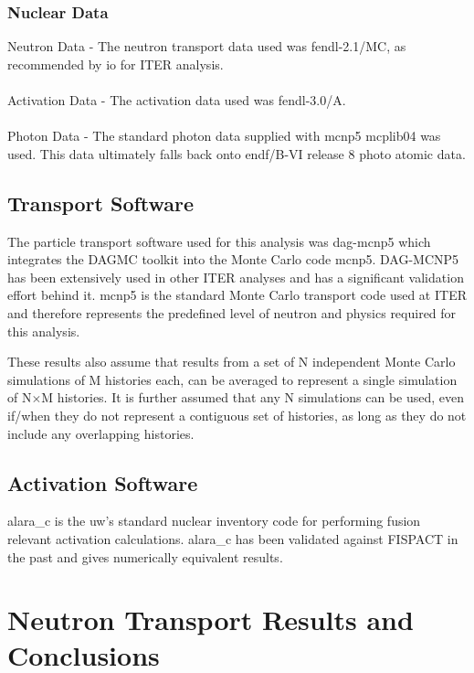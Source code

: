 \documentclass[12pt]{article}
\begin{document}
\subsubsection*{Nuclear Data}
Neutron Data - The neutron transport data used was \gls{fendl}-2.1/MC, as 
recommended by \gls{io} for ITER analysis. 
\\
\\
Activation Data - The activation data used was \gls{fendl}-3.0/A.
\\
\\
Photon Data - The standard photon data supplied with \gls{mcnp5} mcplib04 was 
used. This data ultimately falls back onto \gls{endf}/B-VI release 8 photo
atomic data.

\subsection{Transport Software}
The particle transport software used for this analysis was \gls{dag}-\gls{mcnp5}
which integrates the DAGMC toolkit into the Monte Carlo code \gls{mcnp5}. 
DAG-MCNP5 has been extensively used in other ITER analyses and has a significant
validation effort behind it. \gls{mcnp5} is the standard Monte Carlo transport code
used at ITER and therefore represents the predefined level of neutron and physics
required for this analysis.

These results also assume that results from a set of N independent Monte Carlo
simulations of M histories each, can be averaged to represent a single
simulation of N$\times$M histories.  It is further assumed that any N
simulations can be used, even if/when they do not represent a contiguous set
of histories, as long as they do not include any overlapping histories.

\subsection{Activation Software}
\gls{alara_c} is the \gls{uw}'s standard nuclear inventory code for performing
fusion relevant activation calculations. \gls{alara_c} has been validated against 
FISPACT \cite{fispact} in the past and gives numerically equivalent results. 

\newpage
\clearpage
\section{Neutron Transport Results and Conclusions}
\end{document}
